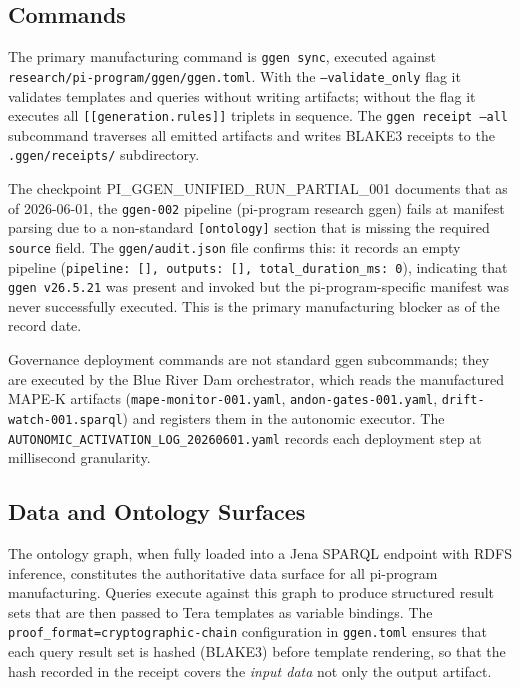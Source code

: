\subsection{Commands}
\label{sec:research-pi-program-impl-commands}

The primary manufacturing command is \texttt{ggen sync}, executed against \texttt{research/pi-program/ggen/ggen.toml}. With the \texttt{--validate\_only} flag it validates templates and queries without writing artifacts; without the flag it executes all \texttt{[[generation.rules]]} triplets in sequence. The \texttt{ggen receipt --all} subcommand traverses all emitted artifacts and writes BLAKE3 receipts to the \texttt{.ggen/receipts/} subdirectory.

The checkpoint PI\_GGEN\_UNIFIED\_RUN\_PARTIAL\_001 documents that as of 2026-06-01, the \texttt{ggen-002} pipeline (pi-program research ggen) fails at manifest parsing due to a non-standard \texttt{[ontology]} section that is missing the required \texttt{source} field. The \texttt{ggen/audit.json} file confirms this: it records an empty pipeline (\texttt{pipeline: [], outputs: [], total\_duration\_ms: 0}), indicating that \texttt{ggen v26.5.21} was present and invoked but the pi-program-specific manifest was never successfully executed. This is the primary manufacturing blocker as of the record date.

Governance deployment commands are not standard ggen subcommands; they are executed by the Blue River Dam orchestrator, which reads the manufactured MAPE-K artifacts (\texttt{mape-monitor-001.yaml}, \texttt{andon-gates-001.yaml}, \texttt{drift-watch-001.sparql}) and registers them in the autonomic executor. The \texttt{AUTONOMIC\_ACTIVATION\_LOG\_20260601.yaml} records each deployment step at millisecond granularity.

\subsection{Data and Ontology Surfaces}
\label{sec:research-pi-program-impl-data}

The ontology graph, when fully loaded into a Jena SPARQL endpoint with RDFS inference, constitutes the authoritative data surface for all pi-program manufacturing. Queries execute against this graph to produce structured result sets that are then passed to Tera templates as variable bindings. The \texttt{proof\_format=cryptographic-chain} configuration in \texttt{ggen.toml} ensures that each query result set is hashed (BLAKE3) before template rendering, so that the hash recorded in the receipt covers the \textit{input data} not only the output artifact.

